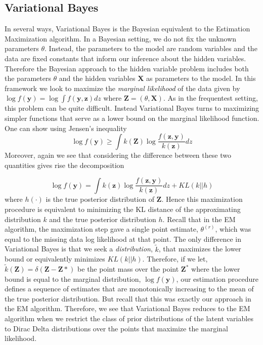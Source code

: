 \documentclass{article}
\begin{document}
\subsection{Variational Bayes}
In several ways, Variational Bayes is the Bayesian equivalent to the Estimation Maximization algorithm. In a Bayesian setting, we do not fix the unknown parameters $\theta$. Instead, the parameters to the model are random variables and the data are fixed constants that inform our inference about the hidden variables. Therefore the Bayesian approach to the hidden variable problem includes both the parameters $\theta$ and the hidden variables $\mathbf{X}$ as parameters to the model. In this framework we look to maximize the \textit{marginal likelihood} of the data given by $\log f(\mathbf{y}) = \log\int f(\mathbf{y},\mathbf{z})dz$ where $\mathbf{Z} = (\theta, \mathbf{X})$. As in the frequentest setting, this problem can be quite difficult. Instead Variational Bayes turns to maximizing simpler functions that serve as a lower bound on the marginal likelihood function. One can show using Jensen's inequality $$\log f(\mathbf{y}) \geq \int k(\mathbf{Z})\log\frac{f(\mathbf{z},\mathbf{y})}{k(\mathbf{z})}dz$$ Moreover, again we see that considering the difference between these two quantities gives rise the decomposition 

\begin{equation}
\log f(\mathbf{y}) = \int k(\mathbf{z})\log\frac{f(\mathbf{z},\mathbf{y})}{k(\mathbf{z})}dz + KL(k||h)
\end{equation}
where $h(\cdot)$ is the true posterior distribution of $\mathbf{Z}$. Hence this maximization procedure is equivalent to minimizing the KL distance of the approximating distribution $k$ and the true posterior distribution $h$. Recall that in the EM algorithm, the maximization step gave a single point estimate, $\theta^{(r)}$, which was equal to the missing data log likelihood at that point. The only difference in Variational Bayes is that we seek a \textit{distribution}, $\tilde{k}$, that maximizes the lower bound or equivalently minimizes $KL(k||h)$. Therefore, if we let,  $\tilde{k}(\mathbf{Z}) = \delta(\mathbf{Z} - \mathbf{Z}{*})$ be the point mass over the point $\mathbf{Z}^{*}$ where the lower bound is equal to the marginal distribution, $\log f(\mathbf{y})$, our estimation procedure defines a sequence of estimates that are monotonically increasing to the mean of the true posterior distribution. But recall that this was exactly our approach in the EM algorithm. Therefore, we see that Variational Bayes reduces to the EM algorithm when we restrict the class of prior distributions of the latent variables to Dirac Delta distributions over the points that maximize the marginal likelihood. 
\end{document}

